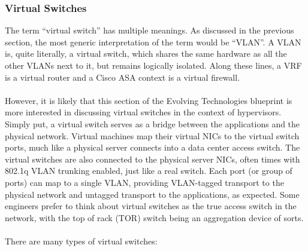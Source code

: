 \subsubsection{Virtual Switches}
The term ``virtual switch'' has multiple meanings. As discussed in the previous
section, the most generic interpretation of the term would be ``VLAN''. A VLAN
is, quite literally, a virtual switch, which shares the same hardware as all
the other VLANs next to it, but remains logically isolated. Along these lines,
a VRF is a virtual router and a Cisco ASA context is a virtual firewall.
\\ \\
However, it is likely that this section of the Evolving Technologies blueprint
is more interested in discussing virtual switches in the context of
hypervisors. Simply put, a virtual switch serves as a bridge between the
applications and the physical network. Virtual machines map their virtual NICs
to the virtual switch ports, much like a physical server connects into a data
center access switch. The virtual switches are also connected to the physical
server NICs, often times with 802.1q VLAN trunking enabled, just like a real
switch. Each port (or group of ports) can map to a single VLAN, providing
VLAN-tagged transport to the physical network and untagged transport to the
applications, as expected. Some engineers prefer to think about virtual
switches as the true access switch in the network, with the top of rack (TOR)
switch being an aggregation device of sorts.
\\ \\
There are many types of virtual switches:
